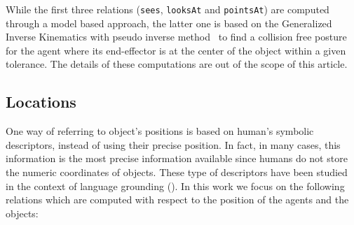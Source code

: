 \documentclass{svmult}
\newcommand{\concept}[1]{{\footnotesize \texttt{#1}}}
\begin{document}
While the first three relations (\concept{sees}, \concept{looksAt} and
\concept{pointsAt}) are computed through a model based approach, the latter one
is based on the Generalized Inverse Kinematics with pseudo inverse
method~\cite{Nakamura90,Baerlocher04} to find a collision free posture for the
agent where its end-effector is at the center of the object within a given
tolerance. The details of these computations are out of the scope of this
article.

\subsection{Locations}

One way of referring to object's positions is based on human's symbolic 
descriptors, instead of using their precise position. In fact, in many cases, 
this information is the most precise information available since humans do not 
store the numeric coordinates of objects. These type of descriptors have been 
studied in the context of language grounding 
(\cite{O'Keefe1999,Matuszek2010,Regier2001,Kelleher2009,Blisard2005}). In this 
work we focus on the following relations which are computed with respect to the 
position of the agents and the objects:
\end{document}
